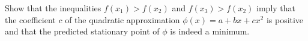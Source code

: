 \begin{proposition}
    Show that the inequalities \(f(x_1)>f(x_2)\) and \(f(x_3)>f(x_2)\) imply that the coefficient \(c\) of the quadratic approximation \(\phi(x)=a+bx+cx^2\) is positive and that the predicted stationary point of \(\phi\) is indeed a minimum.
\end{proposition}